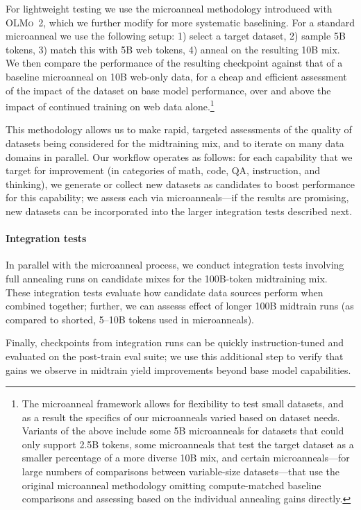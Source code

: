 \documentclass[table]{ai2style/ai2}
\newcommand{\oldOlmo}{OLMo\xspace}
\newcommand{\olmotoo}{\textsc{\oldOlmo~2}\xspace}
\begin{document}
For lightweight testing we use the microanneal methodology introduced with \olmotoo, which we further modify for more systematic baselining. For a standard microanneal we use the following setup: 1) select a target dataset, 2) sample 5B tokens, 3) match this with 5B web tokens, 4) anneal on the resulting 10B mix. We then compare the performance of the resulting checkpoint against that of a baseline microanneal on 10B web-only data, for a cheap and efficient assessment of the impact of the dataset on base model performance, over and above the impact of continued training on web data alone.\footnote{The microanneal framework allows for flexibility to test small datasets, and as a result the specifics of our microanneals varied based on dataset needs. Variants of the above include some 5B microanneals for datasets that could only support 2.5B tokens, some microanneals that test the target dataset as a smaller percentage of a more diverse 10B mix, and certain microanneals---for large numbers of comparisons between variable-size datasets---that use the original microanneal methodology omitting compute-matched baseline comparisons and assessing based on the individual annealing gains directly.}

This methodology allows us to make rapid, targeted assessments of the quality of datasets being considered for the midtraining mix, and to iterate on many data domains in parallel. 
Our workflow operates as follows: for each capability that we target for improvement  (in categories of math, code, QA, instruction, and thinking), we generate or collect new datasets  as candidates to boost performance for this capability; we assess each via microanneals---if the results are promising, new datasets can be incorporated into the larger integration tests described next.

\paragraph{Integration tests}
In parallel with the microanneal process, we conduct integration tests involving full annealing runs on candidate mixes for the 100B-token midtraining mix. 
These integration tests evaluate how candidate data sources perform when combined together;  
further, we can assesss effect of longer 100B midtrain runs (as compared to shorted, 5--10B tokens used in microanneals). 

Finally, checkpoints from integration runs can be quickly instruction-tuned and evaluated on the post-train eval suite; 
we use this additional step to verify that gains we observe in midtrain yield improvements beyond base model capabilities. 
\end{document}
